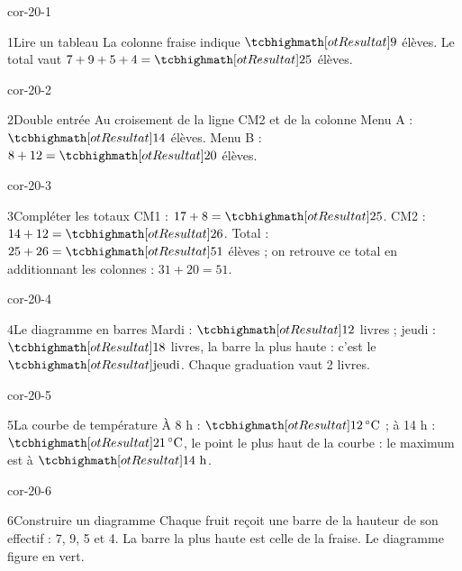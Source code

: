 \clearpage\pagestyle{otMain}\setlength{\otBlocEspacement}{2.5mm}\fontsize{11}{15}\selectfont{}
\begin{blocLivre}{cor-20-1}\begin{corrige}{1}{Lire un tableau}
La colonne fraise indique $\res9$ élèves. Le total vaut $7+9+5+4=\res{25}$ élèves.
\end{corrige}\end{blocLivre}
\begin{blocLivre}{cor-20-2}\begin{corrige}{2}{Double entrée}
Au croisement de la ligne CM2 et de la colonne Menu A : $\res{14}$ élèves. Menu B : $8+12=\res{20}$ élèves.
\end{corrige}\end{blocLivre}
\begin{blocLivre}{cor-20-3}\begin{corrige}{3}{Compléter les totaux}
CM1 : $17+8=\res{25}$. CM2 : $14+12=\res{26}$. Total : $25+26=\res{51}$ élèves ; on retrouve ce total en additionnant les colonnes : $31+20=51$.
\end{corrige}\end{blocLivre}
\begin{blocLivre}{cor-20-4}\begin{corrige}{4}{Le diagramme en barres}
Mardi : $\res{12}$ livres ; jeudi : $\res{18}$ livres, la barre la plus haute : c’est le $\res{\text{jeudi}}$. Chaque graduation vaut 2 livres.
\label{fig-cor-20-4}
\end{corrige}\end{blocLivre}
\begin{blocLivre}{cor-20-5}\begin{corrige}{5}{La courbe de température}
À 8 h : $\res{12\,^\circ\mathrm C}$ ; à 14 h : $\res{21\,^\circ\mathrm C}$, le point le plus haut de la courbe : le maximum est à $\res{14\ \text h}$.
\label{fig-cor-20-5}
\end{corrige}\end{blocLivre}
\begin{blocLivre}{cor-20-6}\begin{corrige}{6}{Construire un diagramme}
Chaque fruit reçoit une barre de la hauteur de son effectif : 7, 9, 5 et 4. La barre la plus haute est celle de la fraise. Le diagramme figure en vert.
\label{fig-cor-20-6}
\end{corrige}\end{blocLivre}

